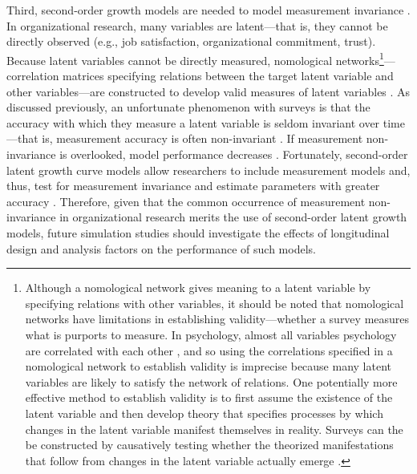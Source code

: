 \documentclass[
12pt, %
twoside,
english]{guelphthesis}
\begin{document}
Third, second-order growth models are needed to model measurement invariance \autocite{sayer2001,hancock2001}. In organizational research, many variables are latent---that is, they cannot be directly observed (e.g., job satisfaction, organizational commitment, trust). Because latent variables cannot be directly measured, nomological networks\footnote{Although a nomological network gives meaning to a latent variable by specifying relations with other variables, it should be noted that nomological networks have limitations in establishing validity---whether a survey measures what is purports to measure. In psychology, almost all variables psychology are correlated with each other \parencite{meehl1978}, and so using the correlations specified in a nomological network to establish validity is imprecise because many latent variables are likely to satisfy the network of relations. One potentially more effective method to establish validity is to first assume the existence of the latent variable and then develop theory that specifies processes by which changes in the latent variable manifest themselves in reality. Surveys can the be constructed by causatively testing whether the theorized manifestations that follow from changes in the latent variable actually emerge \parencite[for a review, see][]{borsboom2004}.}---correlation matrices specifying relations between the target latent variable and other variables---are constructed to develop valid measures of latent variables \autocite{cronbach1955}. As discussed previously, an unfortunate phenomenon with surveys is that the accuracy with which they measure a latent variable is seldom invariant over time---that is, measurement accuracy is often non-invariant \autocite{vandenberg2000,vandeschoot2015}. If measurement non-invariance is overlooked, model performance decreases \autocite{kim2014b,jeon2020}. Fortunately, second-order latent growth curve models allow researchers to include measurement models and, thus, test for measurement invariance and estimate parameters with greater accuracy \autocite[e.g.,][]{kim2014a}. Therefore, given that the common occurrence of measurement non-invariance in organizational research merits the use of second-order latent growth models, future simulation studies should investigate the effects of longitudinal design and analysis factors on the performance of such models.
\end{document}
